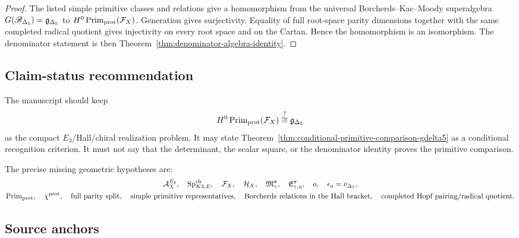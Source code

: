 \begin{proof}
The listed simple primitive classes and relations give a homomorphism from
the universal Borcherds--Kac--Moody superalgebra
\(G(\mathscr B_{\Delta_5})=\mathfrak g_{\Delta_5}\) to
\(H^0\operatorname{Prim}_{\mathrm{prot}}(\mathcal F_X)\).  Generation gives
surjectivity.  Equality of full root-space parity dimensions together with
the same completed radical quotient gives injectivity on every root space
and on the Cartan.  Hence the homomorphism is an isomorphism.  The
denominator statement is then Theorem~\ref{thm:denominator-algebra-identity}.
\end{proof}

\subsection{Claim-status recommendation}

The manuscript should keep
\[
H^0\operatorname{Prim}_{\mathrm{prot}}(\mathcal F_X)
\stackrel{?}{\cong}
\mathfrak g_{\Delta_5}
\]
as the compact \(E_3\)/Hall/chiral realization problem.  It may state
Theorem~\ref{thm:conditional-primitive-comparison-gdelta5} as a conditional
recognition criterion.  It must not say that the determinant, the scalar
square, or the denominator identity proves the primitive comparison.

The precise missing geometric hypotheses are:
\[
\begin{gathered}
\mathcal A_X^{E_3},\quad
\mathrm{Sp}^{\mathrm{ch}}_{K3,E},\quad
\mathcal F_X,\quad
\mathcal H_X,\quad
\mathfrak M_\gamma^\sigma,\quad
\mathfrak E_{\gamma,\eta}^\sigma,\quad
o,\quad
\epsilon_o=\nu_{\Delta_5},\\
\operatorname{Prim}_{\mathrm{prot}},\quad
\chi^{\mathrm{prot}},\quad
\hbox{full parity split},\quad
\hbox{simple primitive representatives},\quad
\hbox{Borcherds relations in the Hall bracket},\quad
\hbox{completed Hopf pairing/radical quotient}.
\end{gathered}
\]

\subsection{Source anchors}

